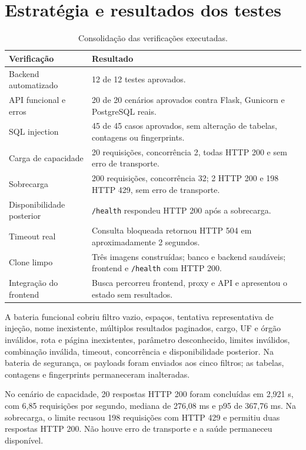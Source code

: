 \documentclass[12pt]{article}
\newcommand{\code}[1]{\texttt{#1}}
\begin{document}
\section{Estratégia e resultados dos testes}

\begin{table}[ht]
\centering
\caption{Consolidação das verificações executadas.}
\label{tab:testes}
\small
\begin{tabularx}{\textwidth}{P{4.0cm}Y}
\toprule
Verificação & Resultado \\
\midrule
Backend automatizado & 12 de 12 testes aprovados. \\
API funcional e erros & 20 de 20 cenários aprovados contra Flask, Gunicorn e PostgreSQL reais. \\
SQL injection & 45 de 45 casos aprovados, sem alteração de tabelas, contagens ou fingerprints. \\
Carga de capacidade & 20 requisições, concorrência 2, todas HTTP 200 e sem erro de transporte. \\
Sobrecarga & 200 requisições, concorrência 32; 2 HTTP 200 e 198 HTTP 429, sem erro de transporte. \\
Disponibilidade posterior & \code{/health} respondeu HTTP 200 após a sobrecarga. \\
Timeout real & Consulta bloqueada retornou HTTP 504 em aproximadamente 2 segundos. \\
Clone limpo & Três imagens construídas; banco e backend saudáveis; frontend e \code{/health} com HTTP 200. \\
Integração do frontend & Busca percorreu frontend, proxy e API e apresentou o estado sem resultados. \\
\bottomrule
\end{tabularx}
\end{table}

A bateria funcional cobriu filtro vazio, espaços, tentativa representativa de
injeção, nome inexistente, múltiplos resultados paginados, cargo, UF e órgão
inválidos, rota e página inexistentes, parâmetro desconhecido, limites
inválidos, combinação inválida, timeout, concorrência e disponibilidade
posterior. Na bateria de segurança, os payloads foram enviados aos cinco
filtros; as tabelas, contagens e fingerprints permaneceram inalteradas.

No cenário de capacidade, 20 respostas HTTP 200 foram concluídas em 2,921 s,
com 6,85 requisições por segundo, mediana de 276,08 ms e p95 de 367,76 ms. Na
sobrecarga, o limite recusou 198 requisições com HTTP 429 e permitiu duas
respostas HTTP 200. Não houve erro de transporte e a saúde permaneceu
disponível.
\end{document}
